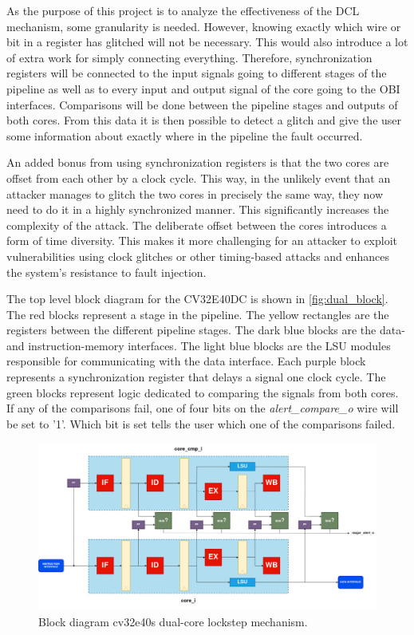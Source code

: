 
As the purpose of this project is to analyze the effectiveness of the DCL mechanism, some granularity is needed. However, knowing exactly which wire or bit in a register has glitched will not be necessary. This would also introduce a lot of extra work for simply connecting everything. Therefore, synchronization registers will be connected to the input signals going to different stages of the pipeline as well as to every input and output signal of the core going to the OBI interfaces. Comparisons will be done between the pipeline stages and outputs of both cores. From this data it is then possible to detect a glitch and give the user some information about exactly where in the pipeline the fault occurred.

An added bonus from using synchronization registers is that the two cores are offset from each other by a clock cycle. This way, in the unlikely event that an attacker manages to glitch the two cores in precisely the same way, they now need to do it in a highly synchronized manner. This significantly increases the complexity of the attack. The deliberate offset between the cores introduces a form of time diversity. This makes it more challenging for an attacker to exploit vulnerabilities using clock glitches or other timing-based attacks and enhances the system's resistance to fault injection. 

The top level block diagram for the CV32E40DC is shown in \autoref{fig:dual_block}. The red blocks represent a stage in the pipeline. The yellow rectangles are the registers between the different pipeline stages. The dark blue blocks are the data- and instruction-memory interfaces. The light blue blocks are the LSU modules responsible for communicating with the data interface. Each purple block represents a synchronization register that delays a signal one clock cycle. The green blocks represent logic dedicated to comparing the signals from both cores. If any of the comparisons fail, one of four bits on the \textit{alert\_compare\_o} wire will be set to '1'. Which bit is set tells the user which one of the comparisons failed.  

\begin{figure}[ht!]
    \centering
    \includegraphics[width=\textwidth]{docs/images/dual_cores-block.png}
    \caption{Block diagram cv32e40s dual-core lockstep mechanism.}
    \label{fig:dual_block}
\end{figure}

